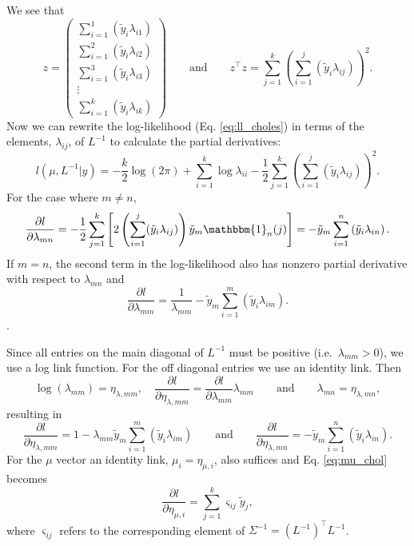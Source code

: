 \documentclass{article}
\begin{document}
%
We see that 
%
\begin{equation}
	z =
  \begin{pmatrix}
    \sum_{i=1}^1 (\tilde{y}_i \lambda_{i1}) \\
    \sum_{i=1}^2 (\tilde{y}_i \lambda_{i2}) \\
    \sum_{i=1}^3 (\tilde{y}_i \lambda_{i3}) \\
    \vdots \\
    \sum_{i=1}^k (\tilde{y}_i \lambda_{ik}) 
  \end{pmatrix}
  \qquad \text{and} \qquad
  z^\top z =
	\sum_{j=1}^k \left( \sum_{i=1}^j \left( \tilde{y}_i \lambda_{ij} \right) \right)^2.
\end{equation}
%
Now we can rewrite the log-likelihood (Eq. \ref{eq:ll_choles}) in terms of the 
elements, $\lambda_{ij}$, of $L^{-1}$ to calculate the partial derivatives:
%
\begin{equation}
	l(\mu, L^{-1}|y) = -\frac{k}{2}\log(2\pi) + \sum_{i=1}^k 
	\log{\lambda_{ii}} - \frac{1}{2} \sum_{j=1}^k 
	\left( \sum_{i=1}^j \left( \tilde{y}_i \lambda_{ij} 
	\right) \right)^2.
 \label{eq:ll_chol_terms}
\end{equation}
%
For the case where $m \neq n$, 
%
\begin{equation}
  \frac{\partial l}{\partial \lambda_{mn}} = 
  -\frac{1}{2} \sum_{j=1}^k \left[2 \left(\sum_{i=1}^j (\tilde{y}_i \lambda_{ij}) 
	\right) \tilde{y}_m \mathbbm{1}_n(j) \right] = 
  - \tilde{y}_m \sum_{i = 1}^{n} \left( \tilde{y}_i \lambda_{in} \right).	
\end{equation}
%
If $m = n$, the second term in the log-likelihood also has nonzero partial 
derivative with respect to $\lambda_{mn}$ and
%
\begin{equation}
  \frac{\partial l}{\partial \lambda_{mm}} = 
	\frac{1}{\lambda_{mm}}- \tilde{y}_m \sum_{i = 1}^{m} 
	\left( \tilde{y}_i \lambda_{im} \right).	
\end{equation}.

Since all entries on the main diagonal of $L^{-1}$ must be positive 
(i.e.\ $\lambda_{mm} > 0$), we use a log link function. For the 
off diagonal entries we use an identity link. Then
%
\begin{equation}
	\log(\lambda_{mm}) = \eta_{\lambda,mm}, \quad
        \frac{\partial l}{\partial \eta_{\lambda,mm}} =
	\frac{\partial l}{\partial \lambda_{mm}} \lambda_{mm}
	\qquad \text{and} \qquad  
        \lambda_{mn} = \eta_{\lambda,mn},
\end{equation}
%
resulting in 
%
\begin{equation}
  \frac{\partial l}{\partial \eta_{\lambda,mm}} =
  1 - \lambda_{mm} \tilde{y}_m \sum_{i=1}^m (\tilde{y}_i \lambda_{im})
  \qquad \text{and} \qquad
  \frac{\partial l}{\partial \eta_{\lambda,mn}} = 
	- \tilde{y}_m \sum_{i = 1}^{n} \left( \tilde{y}_i \lambda_{in} \right).
\end{equation}
%
For the $\mu$ vector an identity link, 
$\mu_i = \eta_{\mu,i}$, also suffices and Eq. \ref{eq:mu_chol} becomes
%
\begin{equation}
  \frac{\partial l}{\partial \eta_{\mu, i}} = 
	\sum_{j=1}^k \varsigma_{ij} \tilde{y}_j, 
\end{equation}
%
where $\varsigma_{ij}$ refers to the corresponding element of 
$\Sigma^{-1} = (L^{-1})^\top L^{-1}$.
\end{document}
